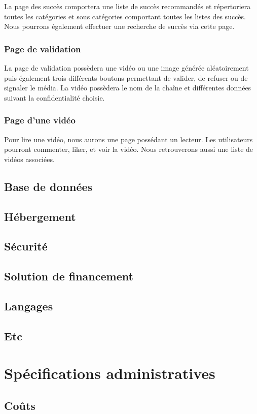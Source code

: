 \documentclass[a4paper,10pt]{article}
\begin{document}
La page des succès comportera une liste de succès recommandés et répertoriera toutes les catégories et sous catégories comportant toutes les listes des succès. Nous pourrons également effectuer une recherche de succès via cette page.

\subsubsection{Page de validation}

La page de validation possèdera une vidéo ou une image générée aléatoirement puis également trois différents boutons permettant de valider, de refuser ou de signaler le média. La vidéo possèdera le nom de la chaîne et différentes données suivant la confidentialité choisie.

\subsubsection{Page d'une vidéo}

Pour lire une vidéo, nous aurons une page possédant un lecteur. Les utilisateurs pourront commenter, liker, et voir la vidéo. Nous retrouverons aussi une liste de vidéos associées.

\subsection{Base de données}
\subsection{Hébergement}
\subsection{Sécurité}
\subsection{Solution de financement}
\subsection{Langages}
\subsection{Etc}
\section{Spécifications administratives}
\subsection{Coûts}
\end{document}
